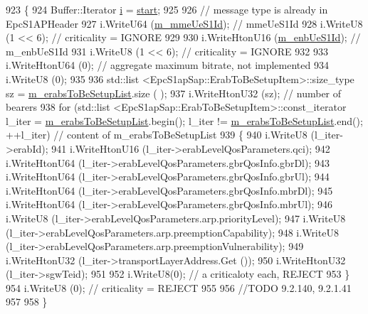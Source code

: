\begin{DoxyCode}
923 \{
924   Buffer::Iterator \hyperlink{bernuolliDistribution_8m_a6f6ccfcf58b31cb6412107d9d5281426}{i} = \hyperlink{namespacevisualizer_1_1core_a2a35e5d8a34af358b508dac8635754e0}{start};
925 
926   \textcolor{comment}{// message type is already in EpcS1APHeader}
927   i.WriteU64 (\hyperlink{classns3_1_1EpcS1APInitialContextSetupRequestHeader_a6a9fdc8227eeed2cd24dfda32418c260}{m\_mmeUeS1Id});         \textcolor{comment}{// mmeUeS1Id}
928   i.WriteU8 (1 << 6);               \textcolor{comment}{// criticality = IGNORE}
929 
930   i.WriteHtonU16 (\hyperlink{classns3_1_1EpcS1APInitialContextSetupRequestHeader_a37f5cdab600c58a26abb754ad2593898}{m\_enbUeS1Id});     \textcolor{comment}{// m\_enbUeS1Id}
931   i.WriteU8 (1 << 6);               \textcolor{comment}{// criticality = IGNORE}
932 
933   i.WriteHtonU64 (0);               \textcolor{comment}{// aggregate maximum bitrate, not implemented}
934   i.WriteU8 (0);
935 
936   std::list <EpcS1apSap::ErabToBeSetupItem>::size\_type sz = \hyperlink{classns3_1_1EpcS1APInitialContextSetupRequestHeader_a8119746e508311886cc8503a52dca315}{m\_erabsToBeSetupList}.size (
      ); 
937   i.WriteHtonU32 (sz);              \textcolor{comment}{// number of bearers}
938   \textcolor{keywordflow}{for} (std::list <EpcS1apSap::ErabToBeSetupItem>::const\_iterator l\_iter = 
      \hyperlink{classns3_1_1EpcS1APInitialContextSetupRequestHeader_a8119746e508311886cc8503a52dca315}{m\_erabsToBeSetupList}.begin(); l\_iter != \hyperlink{classns3_1_1EpcS1APInitialContextSetupRequestHeader_a8119746e508311886cc8503a52dca315}{m\_erabsToBeSetupList}.end();
       ++l\_iter) \textcolor{comment}{// content of m\_erabsToBeSetupList}
939     \{
940       i.WriteU8 (l\_iter->erabId);
941       i.WriteHtonU16 (l\_iter->erabLevelQosParameters.qci);
942       i.WriteHtonU64 (l\_iter->erabLevelQosParameters.gbrQosInfo.gbrDl);
943       i.WriteHtonU64 (l\_iter->erabLevelQosParameters.gbrQosInfo.gbrUl);
944       i.WriteHtonU64 (l\_iter->erabLevelQosParameters.gbrQosInfo.mbrDl);
945       i.WriteHtonU64 (l\_iter->erabLevelQosParameters.gbrQosInfo.mbrUl);
946       i.WriteU8 (l\_iter->erabLevelQosParameters.arp.priorityLevel);
947       i.WriteU8 (l\_iter->erabLevelQosParameters.arp.preemptionCapability);
948       i.WriteU8 (l\_iter->erabLevelQosParameters.arp.preemptionVulnerability);
949       i.WriteHtonU32 (l\_iter->transportLayerAddress.Get ());
950       i.WriteHtonU32 (l\_iter->sgwTeid);
951 
952       i.WriteU8(0); \textcolor{comment}{// a criticaloty each, REJECT}
953     \}
954   i.WriteU8 (0);               \textcolor{comment}{// criticality = REJECT}
955 
956   \textcolor{comment}{//TODO 9.2.140, 9.2.1.41}
957 
958 \}
\end{DoxyCode}


